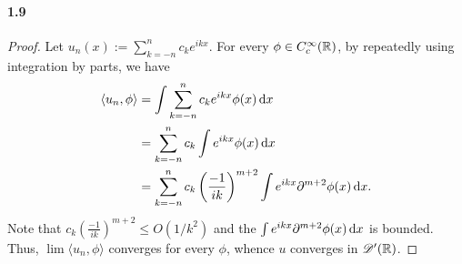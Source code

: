 \paragraph{1.9}
\begin{proof}
  Let $u_n(x) := \sum_{k=-n}^n c_ke^{ikx}$. For every $\phi \in
  C^\infty_c(\mathbb{R})$, by repeatedly using integration by parts, we have
  \begin{align*}
    \langle u_n, \phi\rangle 
    &= \int\sum_{k=-n}^n c_k e^{ikx}\phi(x)\,\mathrm{d} x \\
    &= \sum_{k=-n}^n c_k \int e^{ikx}\phi(x)\,\mathrm{d} x \\
    &= \sum_{k=-n}^n c_k \left(\frac{-1}{ik}\right)^{m+2}
      \int e^{ikx}\partial^{m+2}\phi(x)\,\mathrm{d} x. \\
  \end{align*}
  Note that $c_k \left(\frac{-1}{ik}\right)^{m+2} \le O(1/k^2)$ and the 
  $\int e^{ikx}\partial^{m+2}\phi(x)\,\mathrm{d} x$ is bounded. Thus, $\lim 
  \langle u_n, \phi\rangle$ converges for every $\phi$, whence $u$ converges
  in $\mathscr{D}^\prime(\mathbb{R})$.
\end{proof}











